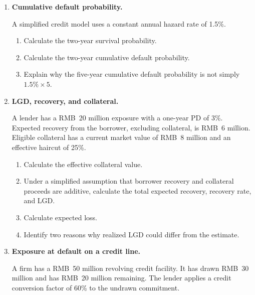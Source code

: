 \begin{enumerate}

\item \textbf{Cumulative default probability.}

A simplified credit model uses a constant annual hazard rate of 1.5\%.

\begin{enumerate}

\item Calculate the two-year survival probability.

\item Calculate the two-year cumulative default probability.

\item Explain why the five-year cumulative default probability is not simply \(1.5\%\times5\).

\end{enumerate}

\item \textbf{LGD, recovery, and collateral.}

A lender has a RMB~20 million exposure with a one-year PD of 3\%. Expected recovery from the borrower, excluding collateral, is RMB~6 million. Eligible collateral has a current market value of RMB~8 million and an effective haircut of 25\%.

\begin{enumerate}

\item Calculate the effective collateral value.

\item Under a simplified assumption that borrower recovery and collateral proceeds are additive, calculate the total expected recovery, recovery rate, and LGD.

\item Calculate expected loss.

\item Identify two reasons why realized LGD could differ from the estimate.

\end{enumerate}

\item \textbf{Exposure at default on a credit line.}

A firm has a RMB~50 million revolving credit facility. It has drawn RMB~30 million and has RMB~20 million remaining. The lender applies a credit conversion factor of 60\% to the undrawn commitment.


\end{enumerate}
